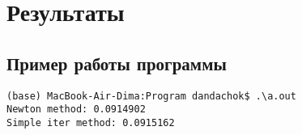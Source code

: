 \section*{Результаты}

\subsection*{Пример работы программы}

\begin{lstlisting}
(base) MacBook-Air-Dima:Program dandachok$ .\a.out
Newton method: 0.0914902
Simple iter method: 0.0915162
\end{lstlisting}

\pagebreak